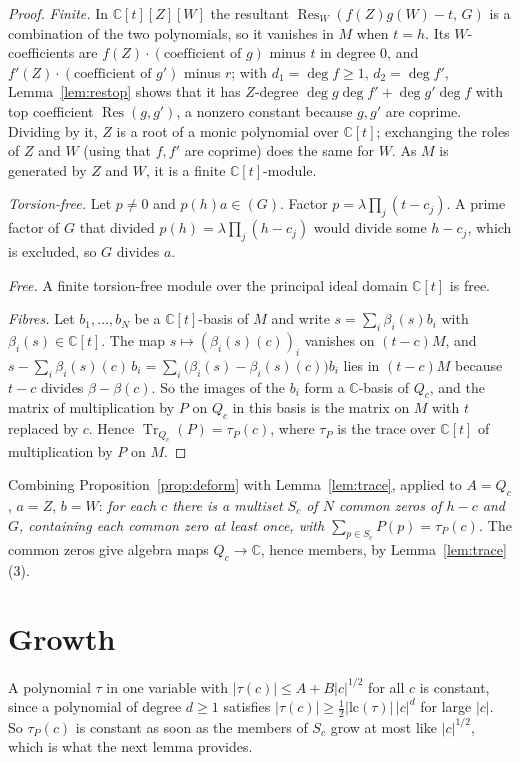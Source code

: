 \documentclass[11pt]{amsart}
\theoremstyle{remark}\newtheorem{remark}[theorem]{Remark}
\theoremstyle{definition}\newtheorem{example}[theorem]{Example}
\newcommand{\C}{\mathbb{C}}
\newcommand{\Tr}{\operatorname{Tr}}
\newcommand{\Res}{\operatorname{Res}}
\begin{document}
\begin{proof}
\emph{Finite.} In $\C[t][Z][W]$ the resultant $\Res_W(f(Z)g(W)-t,\,G)$ is a combination of the two polynomials, so it
vanishes in $M$ when $t=h$. Its $W$-coefficients are $f(Z)\cdot(\text{coefficient of }g)$ minus $t$ in degree $0$,
and $f'(Z)\cdot(\text{coefficient of }g')$ minus $r$; with $d_1=\deg f\ge1$, $d_2=\deg f'$, Lemma~\ref{lem:restop}
shows that it has $Z$-degree $\deg g\deg f'+\deg g'\deg f$ with top coefficient $\Res(g,g')$, a nonzero constant
because $g,g'$ are coprime. Dividing by it, $Z$ is a root of a monic polynomial over $\C[t]$; exchanging the roles
of $Z$ and $W$ (using that $f,f'$ are coprime) does the same for $W$. As $M$ is generated by $Z$ and $W$, it is a
finite $\C[t]$-module.

\emph{Torsion-free.} Let $p\ne0$ and $p(h)a\in(G)$. Factor $p=\lambda\prod_j(t-c_j)$. A prime factor of $G$ that
divided $p(h)=\lambda\prod_j(h-c_j)$ would divide some $h-c_j$, which is excluded, so $G$ divides $a$.

\emph{Free.} A finite torsion-free module over the principal ideal domain $\C[t]$ is free.

\emph{Fibres.} Let $b_1,\dots,b_N$ be a $\C[t]$-basis of $M$ and write $s=\sum_i\beta_i(s)b_i$ with
$\beta_i(s)\in\C[t]$. The map $s\mapsto(\beta_i(s)(c))_i$ vanishes on $(t-c)M$, and
$s-\sum_i\beta_i(s)(c)\,b_i=\sum_i\bigl(\beta_i(s)-\beta_i(s)(c)\bigr)b_i$ lies in $(t-c)M$ because $t-c$ divides
$\beta-\beta(c)$. So the images of the $b_i$ form a $\C$-basis of $Q_c$, and the matrix of multiplication by $P$ on
$Q_c$ in this basis is the matrix on $M$ with $t$ replaced by $c$. Hence $\Tr_{Q_c}(P)=\tau_P(c)$, where $\tau_P$ is
the trace over $\C[t]$ of multiplication by $P$ on $M$.
\end{proof}

Combining Proposition~\ref{prop:deform} with Lemma~\ref{lem:trace}, applied to $A=Q_c$, $a=Z$, $b=W$: \emph{for each
$c$ there is a multiset $S_c$ of $N$ common zeros of $h-c$ and $G$, containing each common zero at least once, with
$\sum_{p\in S_c}P(p)=\tau_P(c)$.} The common zeros give algebra maps $Q_c\to\C$, hence members, by
Lemma~\ref{lem:trace}(3).

\section{Growth}\label{sec:growth}

A polynomial $\tau$ in one variable with $|\tau(c)|\le A+B|c|^{1/2}$ for all $c$ is constant, since a polynomial of
degree $d\ge1$ satisfies $|\tau(c)|\ge\tfrac12|\mathrm{lc}(\tau)|\,|c|^d$ for large $|c|$. So $\tau_P(c)$ is
constant as soon as the members of $S_c$ grow at most like $|c|^{1/2}$, which is what the next lemma provides.
\end{document}
